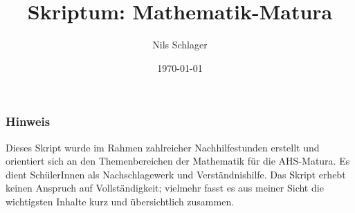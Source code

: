 \documentclass[a4paper,11pt]{article}
\title{\textbf{Skriptum: Mathematik-Matura}}
\author{Nils Schlager}
\date{\today}
\numberwithin{equation}{subsection}
\begin{document}


\setcounter{tocdepth}{2}
\tableofcontents

\vfill
\subsubsection*{Hinweis}
Dieses Skript wurde im Rahmen zahlreicher Nachhilfestunden erstellt und orientiert sich an den Themenbereichen der Mathematik für die AHS-Matura. Es dient SchülerInnen als Nachschlagewerk und Verständnishilfe. Das Skript erhebt keinen Anspruch auf Vollständigkeit; vielmehr fasst es aus meiner Sicht die wichtigsten Inhalte kurz und übersichtlich zusammen.

\pagebreak

\pagebreak

\pagebreak

\pagebreak

\end{document}
